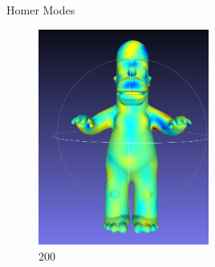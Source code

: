 \documentclass{beamer}
\begin{document}
\begin{frame}{Homer Modes}

\begin{figure}[t]
    \includegraphics[width=0.5\textwidth]{homer200.png}
    \caption*{\huge 200}
\end{figure}

\end{frame}
\end{document}
